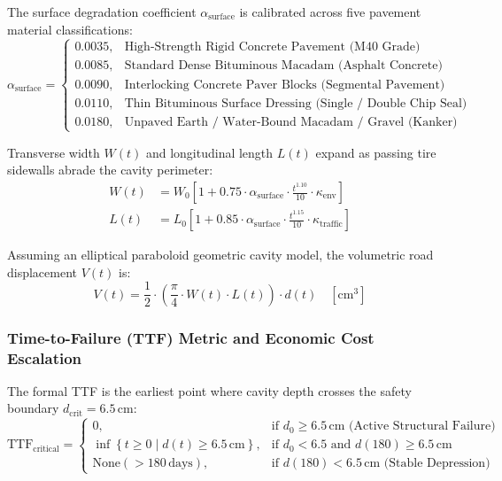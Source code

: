 The surface degradation coefficient $\alpha_{\text{surface}}$ is calibrated across five pavement material classifications:
\begin{equation}
    \alpha_{\text{surface}} = 
    \begin{cases}
        0.0035, & \text{High-Strength Rigid Concrete Pavement (M40 Grade)} \\
        0.0085, & \text{Standard Dense Bituminous Macadam (Asphalt Concrete)} \\
        0.0090, & \text{Interlocking Concrete Paver Blocks (Segmental Pavement)} \\
        0.0110, & \text{Thin Bituminous Surface Dressing (Single / Double Chip Seal)} \\
        0.0180, & \text{Unpaved Earth / Water-Bound Macadam / Gravel (Kanker) Corridors}
    \end{cases}
\end{equation}

Transverse width $W(t)$ and longitudinal length $L(t)$ expand as passing tire sidewalls abrade the cavity perimeter:
\begin{align}
    W(t) &= W_0 \left[ 1 + 0.75 \cdot \alpha_{\text{surface}} \cdot \frac{t^{1.10}}{10} \cdot \kappa_{\text{env}} \right] \\
    L(t) &= L_0 \left[ 1 + 0.85 \cdot \alpha_{\text{surface}} \cdot \frac{t^{1.15}}{10} \cdot \kappa_{\text{traffic}} \right]
\end{align}

Assuming an elliptical paraboloid geometric cavity model, the volumetric road displacement $V(t)$ is:
\begin{equation}
    V(t) = \frac{1}{2} \cdot \left( \frac{\pi}{4} \cdot W(t) \cdot L(t) \right) \cdot d(t) \quad [\text{cm}^3]
    \label{eq:volume_forecast}
\end{equation}

\subsubsection{Time-to-Failure (TTF) Metric and Economic Cost Escalation}
The formal TTF is the earliest point where cavity depth crosses the safety boundary $d_{\text{crit}} = 6.5\,\text{cm}$:
\begin{equation}
    \text{TTF}_{\text{critical}} = 
    \begin{cases}
        0, & \text{if } d_0 \ge 6.5\,\text{cm (Active Structural Failure)} \\
        \inf \left\{ t \ge 0 \mid d(t) \ge 6.5\,\text{cm} \right\}, & \text{if } d_0 < 6.5 \text{ and } d(180) \ge 6.5\,\text{cm} \\
        \text{None} (> 180\,\text{days}), & \text{if } d(180) < 6.5\,\text{cm (Stable Depression)}
    \end{cases}
\end{equation}

